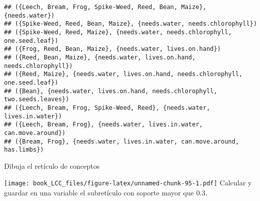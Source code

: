 \documentclass[
]{book}
\newenvironment{Shaded}{\begin{snugshade}}{\end{snugshade}}
\newcommand{\FloatTok}[1]{\textcolor[rgb]{0.00,0.00,0.81}{#1}}
\newcommand{\FunctionTok}[1]{\textcolor[rgb]{0.00,0.00,0.00}{#1}}
\newcommand{\NormalTok}[1]{#1}
\newcommand{\OtherTok}[1]{\textcolor[rgb]{0.56,0.35,0.01}{#1}}
\newcommand{\SpecialCharTok}[1]{\textcolor[rgb]{0.00,0.00,0.00}{#1}}
\begin{document}
\begin{verbatim}
## ({Leech, Bream, Frog, Spike-Weed, Reed, Bean, Maize}, {needs.water})
## ({Spike-Weed, Reed, Bean, Maize}, {needs.water, needs.chlorophyll})
## ({Spike-Weed, Reed, Maize}, {needs.water, needs.chlorophyll, one.seed.leaf})
## ({Frog, Reed, Bean, Maize}, {needs.water, lives.on.hand})
## ({Reed, Bean, Maize}, {needs.water, lives.on.hand, needs.chlorophyll})
## ({Reed, Maize}, {needs.water, lives.on.hand, needs.chlorophyll, one.seed.leaf})
## ({Bean}, {needs.water, lives.on.hand, needs.chlorophyll, two.seeds.leaves})
## ({Leech, Bream, Frog, Spike-Weed, Reed}, {needs.water, lives.in.water})
## ({Leech, Bream, Frog}, {needs.water, lives.in.water, can.move.around})
## ({Bream, Frog}, {needs.water, lives.in.water, can.move.around, has.limbs})
\end{verbatim}

Dibuja el retículo de conceptos

\begin{Shaded}
\end{Shaded}

\texttt{[image: book\_LCC\_files/figure-latex/unnamed-chunk-95-1.pdf]}
Calcular y guardar en una variable el subretículo con soporte mayor que 0.3.

\begin{Shaded}
\end{Shaded}
\end{document}
